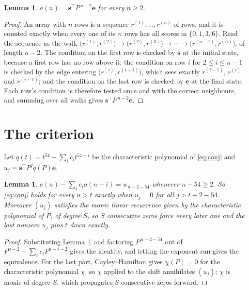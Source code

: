 \documentclass[11pt,a4paper]{article}
\theoremstyle{plain}
\newtheorem{lemma}[theorem]{Lemma}
\theoremstyle{definition}
\begin{document}
\begin{lemma}\label{lem:walk}
$a(n)=\mathbf{s}^{\!\top}P^{\,n-2}\mathbf{e}$ for every $n\ge2$.
\end{lemma}

\begin{proof}
An array with $n$ rows is a sequence $r^{(1)},\dots,r^{(n)}$ of rows, and it is counted
exactly when every one of its $n$ rows has all scores in $\{0,1,3,6\}$. Read the sequence as the
walk $\bigl(r^{(1)},r^{(2)}\bigr)\to\bigl(r^{(2)},r^{(3)}\bigr)\to\cdots\to
\bigl(r^{(n-1)},r^{(n)}\bigr)$, of length $n-2$. The condition on the first row is
checked by $\mathbf{s}$ at the initial state, because a first row has no row above it; the
condition on row $i$ for $2\le i\le n-1$ is checked by the edge entering
$\bigl(r^{(i)},r^{(i+1)}\bigr)$, which sees exactly $r^{(i-1)}$, $r^{(i)}$ and
$r^{(i+1)}$; and the condition on the last row is checked by $\mathbf{e}$ at the final
state. Each row's condition is therefore tested once and with the correct neighbours, and
summing over all walks gives $\mathbf{s}^{\!\top}P^{\,n-2}\mathbf{e}$.
\end{proof}

\section{The criterion}

Let $q(t)=t^{54}-\sum_i c_i t^{54-i}$ be the characteristic polynomial of
\eqref{eq:conj} and $u_j=\mathbf{s}^{\!\top}P^{j}q(P)\mathbf{e}$.

\begin{lemma}\label{lem:crit}
$a(n)-\sum_i c_i a(n-i)=u_{\,n-2-54}$ whenever $n-54\ge2$. So \eqref{eq:conj}
holds for every $n>t$ exactly when $u_j=0$ for all $j>t-2-54$. Moreover $(u_j)$
satisfies the monic linear recurrence given by the characteristic polynomial of $P$, of
degree $S$, so $S$ consecutive zeros force every later one and the last nonzero $u_j$ pins
$t$ down exactly.
\end{lemma}

\begin{proof}
Substituting Lemma~\ref{lem:walk} and factoring $P^{\,n-2-54}$ out of
$P^{n-2}-\sum_i c_i P^{n-i-2}$ gives the identity, and letting the exponent run gives the
equivalence. For the last part, Cayley--Hamilton gives $\chi(P)=0$ for the characteristic
polynomial $\chi$, so $\chi$ applied to the shift annihilates $(u_j)$; $\chi$ is monic of
degree $S$, which propagates $S$ consecutive zeros forward.
\end{proof}
\end{document}
